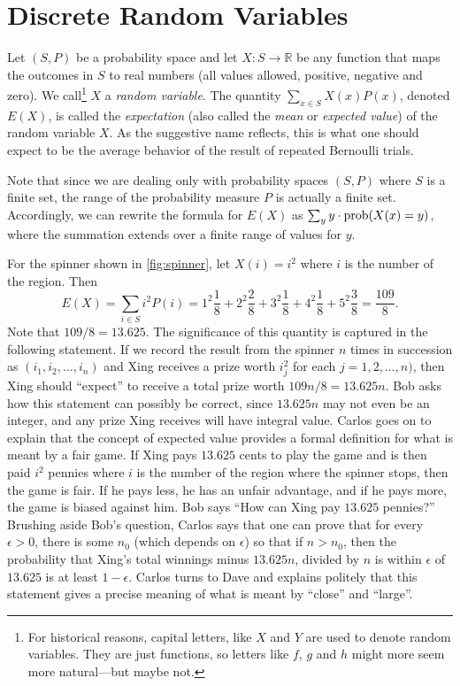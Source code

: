 \section{Discrete Random Variables}

Let $(S,P)$ be a probability space and let
$X:S\longrightarrow\mathbb{R}$ be any function that maps the outcomes
in $S$ to real numbers (all values allowed, positive, negative and
zero).  We call\footnote{For historical reasons, capital letters, like
  $X$ and $Y$ are used to denote random variables.  They are just
  functions, so letters like $f$, $g$ and $h$ might more seem more
  natural---but maybe not.} $X$ a \textit{random variable}.  The
quantity $\sum_{x\in S} X(x)P(x)$, denoted $E(X)$, is called the
\textit{expectation} (also called the \textit{mean} or \emph{expected
  value}) of the random variable $X$.  As the suggestive name
reflects, this is what one should expect to be the average behavior of
the result of repeated Bernoulli trials.

Note that since we are dealing only with probability spaces $(S,P)$ where
$S$ is a finite set, the range of the probability measure $P$ is actually
a finite set.  Accordingly, we can rewrite the formula for $E(X)$ as 
$\sum_y y\cdot \operatorname{prob}(X(x)=y)$, where the summation extends over a finite
range of values for $y$.

\begin{example}
For the spinner shown in \autoref{fig:spinner}, let $X(i)=i^2$ where
$i$ is the number of the region.  Then 
\[
E(X)=\sum_{i\in S} i^2P(i)=1^2\frac{1}{8}+2^2\frac{2}{8}+3^2\frac{1}{8}+
   4^2\frac{1}{8}+5^2\frac{3}{8}=\frac{109}{8}.
\]
Note that $109/8=13.625$.  The significance of this quantity is
captured in the following statement.  If we record the result from the
spinner $n$ times in succession as $(i_1,i_2,\dots,i_n)$ and Xing
receives a prize worth $i_j^2$ for each $j=1,2,\dots,n)$, then Xing
should ``expect'' to receive a total prize worth $109n/8=13.625n$.
Bob asks how this statement can possibly be correct, since $13.625n$
may not even be an integer, and any prize Xing receives will have
integral value.  Carlos goes on to explain that the concept of
expected value provides a formal definition for what is meant by a
fair game.  If Xing pays $13.625$ cents to play the game and is then
paid $i^2$ pennies where $i$ is the number of the region where the
spinner stops, then the game is fair.  If he pays less, he has an
unfair advantage, and if he pays more, the game is biased against him.
Bob says ``How can Xing pay $13.625$ pennies?''  Brushing aside Bob's
question, Carlos says that one can prove that for every $\epsilon >0$,
there is some $n_0$ (which depends on $\epsilon$) so that if $n>n_0$,
then the probability that Xing's total winnings minus $13.625n$,
divided by $n$ is within $\epsilon$ of $13.625$ is at least
$1-\epsilon$.  Carlos turns to Dave and explains politely that this
statement gives a precise meaning of what is meant by ``close'' and
``large''.
\end{example}

